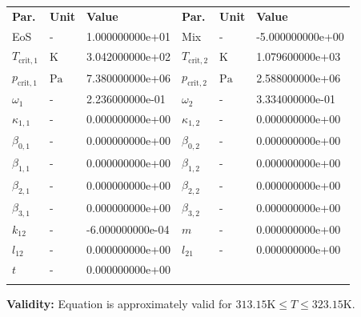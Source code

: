 \begin{longtable}[l]{lll|lll}
\toprule
\addlinespace
\textbf{Par.} & \textbf{Unit} & \textbf{Value} &	\textbf{Par.} & \textbf{Unit} & \textbf{Value} \\
\addlinespace
\midrule
\endhead

\bottomrule
\endfoot
\bottomrule
\endlastfoot
\addlinespace

EoS & - & 1.000000000e+01 & Mix & - & -5.000000000e+00 \\
$T_\mathrm{crit,1}$ & $\si{\kelvin}$ & 3.042000000e+02 & $T_\mathrm{crit,2}$ & $\si{\kelvin}$ & 1.079600000e+03 \\
$p_\mathrm{crit,1}$ & $\si{\pascal}$ & 7.380000000e+06 & $p_\mathrm{crit,2}$ & $\si{\pascal}$ & 2.588000000e+06 \\
$\omega_{1}$ & - & 2.236000000e-01 & $\omega_{2}$ & - & 3.334000000e-01 \\
$\kappa_{1,1}$ & - & 0.000000000e+00 & $\kappa_{1,2}$ & - & 0.000000000e+00 \\
$\beta_{0,1}$ & - & 0.000000000e+00 & $\beta_{0,2}$ & - & 0.000000000e+00 \\
$\beta_{1,1}$ & - & 0.000000000e+00 & $\beta_{1,2}$ & - & 0.000000000e+00 \\
$\beta_{2,1}$ & - & 0.000000000e+00 & $\beta_{2,2}$ & - & 0.000000000e+00 \\
$\beta_{3,1}$ & - & 0.000000000e+00 & $\beta_{3,2}$ & - & 0.000000000e+00 \\
$k_{12}$ & - & -6.000000000e-04 & $m$ & - & 0.000000000e+00 \\
$l_{12}$ & - & 0.000000000e+00 & $l_{21}$ & - & 0.000000000e+00 \\
$t$ & - & 0.000000000e+00 & & & \\

\addlinespace\end{longtable}

\textbf{Validity:}
\newline
Equation is approximately valid for $313.15 \si{\kelvin} \leq T \leq 323.15 \si{\kelvin}$.
\newline

